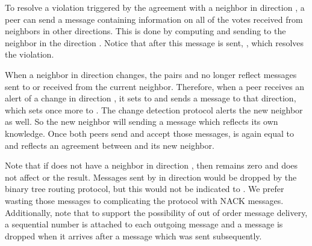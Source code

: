 \documentclass[12pt,english,journal]{elsarticle}
\numberwithin{equation}{section}
\numberwithin{figure}{section}
\theoremstyle{plain}
\theoremstyle{plain}
\begin{document}
To resolve a violation triggered by the agreement with a neighbor
in direction , a peer can send a message containing information
on all of the votes received from neighbors in other directions. This
is done by computing  and
sending  to the neighbor in the direction . Notice that
after this message is sent, ,
which resolves the violation.

When a neighbor in direction  changes, the pairs  and
 no longer reflect messages sent to or received from the
current neighbor. Therefore, when a peer receives an alert of a change
in direction , it sets  to  and sends
a message to that direction, which sets  once
more to . The change detection protocol alerts the
new neighbor as well. So the new neighbor will sending a message which
reflects its own knowledge. Once both peers send and accept those
messages,  is again equal to 
and reflects an agreement between  and its new neighbor.

Note that if  does not have a neighbor in direction ,
then  remains zero and does not affect 
or the result. Messages sent by  in direction  would be
dropped by the binary tree routing protocol, but this would not be
indicated to . We prefer wasting those messages to complicating
the protocol with NACK messages. Additionally, note that to support
the possibility of out of order message delivery, a sequential number
is attached to each outgoing message and a message is dropped when
it arrives after a message which was sent subsequently.
\end{document}
